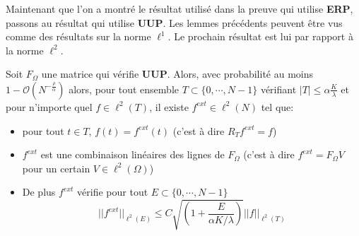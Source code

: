 Maintenant que l'on a montré le résultat utilisé dans la preuve qui utilise \textbf{ERP}, passons au résultat qui utilise \textbf{UUP}.
\newline
Les lemmes précédents peuvent être vus comme des résultats sur la norme $\ell^1$. Le prochain résultat est lui par rapport à la norme $\ell^2$. 
\begin{lemme}\label{th:tao3}
	Soit $F_\Omega$ une matrice qui vérifie \textbf{UUP}. Alors, avec probabilité au moins $1-\mathcal{O}(N^{-\frac{\rho}{\alpha}})$ alors, pour tout ensemble $T\subset \{0, \cdots, N-1\}$ vérifiant $|T| \leq \alpha \frac{K}{\lambda}$
	et pour n'importe quel $f\in \ell^2(T)$, il existe $f^{ext} \in \ell^2(N)$ tel que:
	\begin{itemize}
		\item pour tout $t \in T$, $f(t) = f^{ext}(t)$ (c'est à dire $R_T f^{ext} = f$)
	
		\item $f^{ext}$ est une combinaison linéaires des lignes de $F_\Omega$ (c'est à dire $f^{ext} = F_\Omega V$ pour un certain $V \in \ell^2(\Omega)$)
		\item De plus $f^{ext}$ vérifie pour tout $E\subset \{0, \cdots, N-1\}$
		\begin{equation}
			||f^{ext}||_{\ell^2(E)} \leq C\sqrt{(1 + \frac{E}{\alpha K /\lambda})} ||f||_{\ell^2(T)}
		\end{equation}
	\end{itemize}
\end{lemme}
